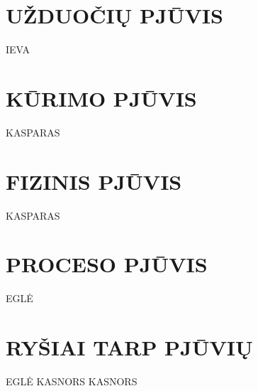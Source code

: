 \documentclass{VUMIFPSkursinis}
\begin{document}
\section{UŽDUOČIŲ PJŪVIS}
IEVA
\newpage
\section{KŪRIMO PJŪVIS}
KASPARAS
\newpage
\section{FIZINIS PJŪVIS}
KASPARAS
\newpage
\section{PROCESO PJŪVIS}
EGLĖ
\newpage
\section{RYŠIAI TARP PJŪVIŲ}
EGLĖ
\newpage
{}
KASNORS
\newpage
{}
KASNORS
\end{document}
